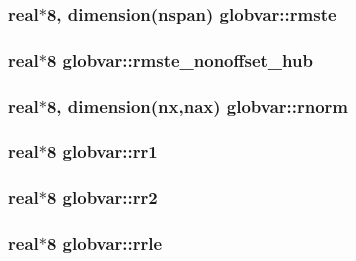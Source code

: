 \subsubsection[{rmste}]{\setlength{\rightskip}{0pt plus 5cm}real$\ast$8, dimension({\bf nspan}) globvar\+::rmste}\label{namespaceglobvar_a74bf48252c7df2668280317e7f2054de}
\hypertarget{namespaceglobvar_ac10c9231253c0f30759eab0d2614b736}{}
\subsubsection[{rmste\+\_\+nonoffset\+\_\+hub}]{\setlength{\rightskip}{0pt plus 5cm}real$\ast$8 globvar\+::rmste\+\_\+nonoffset\+\_\+hub}\label{namespaceglobvar_ac10c9231253c0f30759eab0d2614b736}
\hypertarget{namespaceglobvar_a1c81ec5abec812f5f2b8f01ca55a6b50}{}
\subsubsection[{rnorm}]{\setlength{\rightskip}{0pt plus 5cm}real$\ast$8, dimension({\bf nx},{\bf nax}) globvar\+::rnorm}\label{namespaceglobvar_a1c81ec5abec812f5f2b8f01ca55a6b50}
\hypertarget{namespaceglobvar_a2e507bd95b509159a6effc2df430ab18}{}
\subsubsection[{rr1}]{\setlength{\rightskip}{0pt plus 5cm}real$\ast$8 globvar\+::rr1}\label{namespaceglobvar_a2e507bd95b509159a6effc2df430ab18}
\hypertarget{namespaceglobvar_a7f8c759616a63ffb90fff7d59c3b86df}{}
\subsubsection[{rr2}]{\setlength{\rightskip}{0pt plus 5cm}real$\ast$8 globvar\+::rr2}\label{namespaceglobvar_a7f8c759616a63ffb90fff7d59c3b86df}
\hypertarget{namespaceglobvar_a600638b0ac89d9ce06362b3e345a247f}{}
\subsubsection[{rrle}]{\setlength{\rightskip}{0pt plus 5cm}real$\ast$8 globvar\+::rrle}\label{namespaceglobvar_a600638b0ac89d9ce06362b3e345a247f}
\hypertarget{namespaceglobvar_a6ca5b58308ba043d9dd929b77a5be5f6}{}
